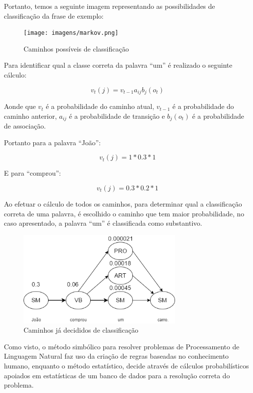 Portanto, temos a seguinte imagem representando as possibilidades de
classificação da frase de exemplo:

\begin{figure}[htbp]
 \centering
 \texttt{[image: imagens/markov.png]}
 \caption{Caminhos possíveis de classificação}
 \label{fig:markov}
\end{figure}

Para identificar qual a classe correta da palavra ``um'' é realizado o seguinte
cálculo:

\[ v_t(j) = v_{t-1} a_{ij} b_j(o_t) \]

Aonde que $v_t$ é a probabilidade do caminho atual, $v_{t-1}$ é a
probabilidade do caminho anterior, $a_{ij}$ é a probabilidade de transição e $b_j(o_t)$ é a
probabilidade de associação.

Portanto para a palavra ``João'':

\[ v_t(j) = 1 * 0.3 * 1 \]

E para ``comprou'':

\[ v_t(j) = 0.3 * 0.2 * 1 \] 

Ao efetuar o cálculo de todos os caminhos, para determinar qual a classificação
correta de uma palavra, é escolhido o caminho que tem maior probabilidade, no
caso apresentado, a palavra ``um'' é classificada como substantivo.

\begin{figure}[htbp]
 \centering
 \includegraphics[height=180px]{imagens/markov2.png}
 \caption{Caminhos já decididos de classificação}
 \label{fig:markov2}
\end{figure}

Como visto, o método simbólico para resolver problemas de Processamento de
Linguagem Natural faz uso da criação de regras baseadas no conhecimento humano,
enquanto o método estatístico, decide através de cálculos probabilísticos
apoiados em estatísticas de um banco de dados para a resolução correta do
problema.


